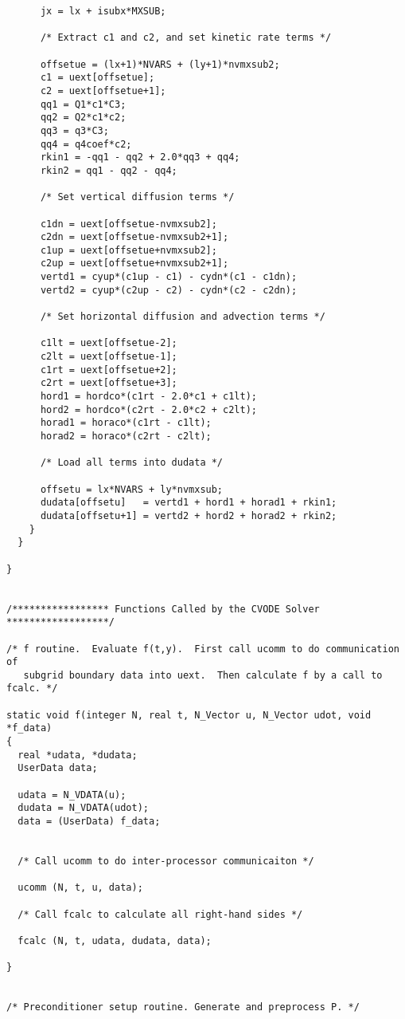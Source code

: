 \begin{verbatim}
      jx = lx + isubx*MXSUB;

      /* Extract c1 and c2, and set kinetic rate terms */

      offsetue = (lx+1)*NVARS + (ly+1)*nvmxsub2;
      c1 = uext[offsetue];
      c2 = uext[offsetue+1];
      qq1 = Q1*c1*C3;
      qq2 = Q2*c1*c2;
      qq3 = q3*C3;
      qq4 = q4coef*c2;
      rkin1 = -qq1 - qq2 + 2.0*qq3 + qq4;
      rkin2 = qq1 - qq2 - qq4;

      /* Set vertical diffusion terms */

      c1dn = uext[offsetue-nvmxsub2];
      c2dn = uext[offsetue-nvmxsub2+1];
      c1up = uext[offsetue+nvmxsub2];
      c2up = uext[offsetue+nvmxsub2+1];
      vertd1 = cyup*(c1up - c1) - cydn*(c1 - c1dn);
      vertd2 = cyup*(c2up - c2) - cydn*(c2 - c2dn);

      /* Set horizontal diffusion and advection terms */

      c1lt = uext[offsetue-2];
      c2lt = uext[offsetue-1];
      c1rt = uext[offsetue+2];
      c2rt = uext[offsetue+3];
      hord1 = hordco*(c1rt - 2.0*c1 + c1lt);
      hord2 = hordco*(c2rt - 2.0*c2 + c2lt);
      horad1 = horaco*(c1rt - c1lt);
      horad2 = horaco*(c2rt - c2lt);

      /* Load all terms into dudata */

      offsetu = lx*NVARS + ly*nvmxsub;
      dudata[offsetu]   = vertd1 + hord1 + horad1 + rkin1; 
      dudata[offsetu+1] = vertd2 + hord2 + horad2 + rkin2;
    }
  }

}


/***************** Functions Called by the CVODE Solver ******************/

/* f routine.  Evaluate f(t,y).  First call ucomm to do communication of 
   subgrid boundary data into uext.  Then calculate f by a call to fcalc. */

static void f(integer N, real t, N_Vector u, N_Vector udot, void *f_data)
{
  real *udata, *dudata;
  UserData data;

  udata = N_VDATA(u);
  dudata = N_VDATA(udot);
  data = (UserData) f_data;


  /* Call ucomm to do inter-processor communicaiton */

  ucomm (N, t, u, data);

  /* Call fcalc to calculate all right-hand sides */

  fcalc (N, t, udata, dudata, data);

}


/* Preconditioner setup routine. Generate and preprocess P. */


\end{verbatim}
